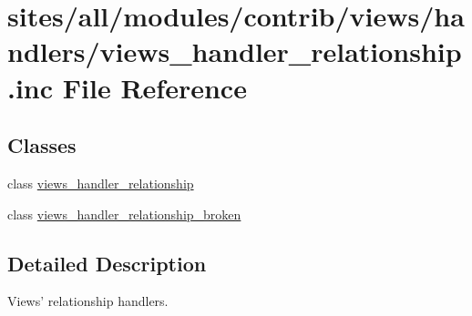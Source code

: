 \hypertarget{views__handler__relationship_8inc}{
\section{sites/all/modules/contrib/views/handlers/views\_\-handler\_\-relationship.inc File Reference}
\label{views__handler__relationship_8inc}
}
\subsection*{Classes}
\begin{CompactItemize}
\item 
class \hyperlink{classviews__handler__relationship}{views\_\-handler\_\-relationship}
\item 
class \hyperlink{classviews__handler__relationship__broken}{views\_\-handler\_\-relationship\_\-broken}
\end{CompactItemize}


\subsection{Detailed Description}
Views' relationship handlers. 